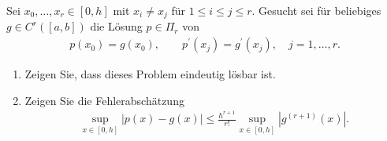 \begin{exercise}
Sei $x_0,\dots,x_r \in [0,h]$ mit $x_i \neq x_j$ für $1 \leq i \leq j \leq r$.
Gesucht sei für beliebiges $g \in C^r([a,b])$ die Lösung $p \in \Pi_r$ von
\begin{align}
  p(x_0) = g(x_0), \qquad p^{\prime}(x_j) = g^{\prime}(x_j), \quad j = 1,\dots,r.
\end{align}
\begin{enumerate}[label = \textbf{\alph*)}]
  \item Zeigen Sie, dass dieses Problem eindeutig lösbar ist.
  \item Zeigen Sie die Fehlerabschätzung
  \begin{align}
    \sup_{x \in [0,h]} |p(x) - g(x)| \leq \frac{h^{r+1}}{r!}
    \sup_{x \in [0,h]}\left|g^{(r + 1)}(x)\right|.
  \end{align}
\end{enumerate}
\end{exercise}
